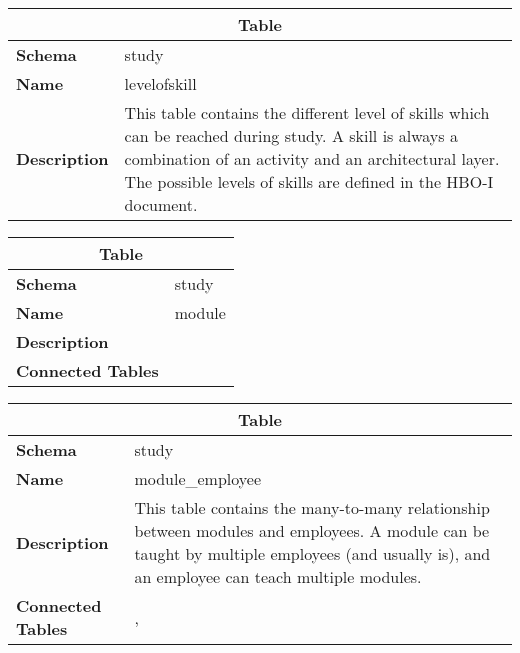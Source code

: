 \begin{table}[H]
	\label{table:levelofskill}
	\centering
	\begin{tabular}{|p{}|p{}|}
		\hline
		\multicolumn{2}{|c|}{\textbf{Table}} \\ \hline
		\textbf{Schema}               & study \\ \hline
		\textbf{Name}                 & levelofskill \\ \hline
		\textbf{Description}          & This table contains the different level of skills which can be reached during study. A skill is always a combination of an activity and an architectural layer. The possible levels of skills are defined in the HBO-I document. \\ \hline
	\end{tabular}
\end{table}

\begin{table}[H]
	\label{table:module}
	\centering
	\begin{tabular}{|p{}|p{}|}
		\hline
		\multicolumn{2}{|c|}{\textbf{Table}} \\ \hline
		\textbf{Schema}               & study \\ \hline
		\textbf{Name}                 & module \\ \hline
		\textbf{Description}          &      \\ \hline
		\textbf{Connected Tables}     &      \\ \hline
	\end{tabular}
\end{table}

\begin{table}[H]
	\label{table:module_employee}
	\centering
	\begin{tabular}{|p{}|p{}|}
		\hline
		\multicolumn{2}{|c|}{\textbf{Table}} \\ \hline
		\textbf{Schema}               & study \\ \hline
		\textbf{Name}                 & module\_employee \\ \hline
		\textbf{Description}          & This table contains the many-to-many relationship between modules and employees. A module can be taught by multiple employees (and usually is), and an employee can teach multiple modules. \\ \hline
		\textbf{Connected Tables}     & \tableref{module}, \tableref{employee} \\ \hline
	\end{tabular}
\end{table}

